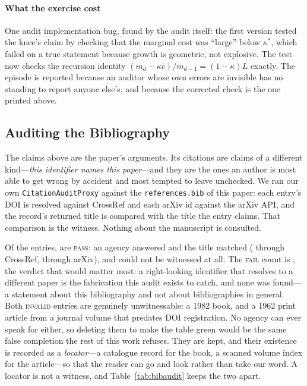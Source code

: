 \documentclass[conference]{IEEEtran}
\theoremstyle{definition}
\begin{document}
\paragraph{What the exercise cost} One audit implementation bug, found by the audit
itself: the first version tested the knee's claim by checking that the marginal
cost was ``large'' below $\kappa^{*}$, which failed on a true statement because
growth is geometric, not explosive. The test now checks the recursion identity
$({m_d-\kappa\bar c})/{m_{d-1}}=(1-\kappa)L$ exactly. The episode is reported
because an auditor whose own errors are invisible has no standing to report anyone
else's, and because the corrected check is the one printed above.

\subsection{Auditing the Bibliography}
\label{sec:bibaudit}

The claims above are the paper's arguments. Its citations are claims of a different
kind---\emph{this identifier names this paper}---and they are the ones an author is
most able to get wrong by accident and most tempted to leave unchecked. We ran our
own \texttt{CitationAuditProxy} against the \texttt{references.bib} of this paper:
each entry's DOI is resolved against CrossRef and each arXiv id against the arXiv
API, and the record's returned title is compared with the title the entry claims.
That comparison is the witness. Nothing about the manuscript is consulted.

Of the \caTotal{} entries, \caPass{} are \textsc{pass}: an agency answered and the
title matched (\caCrossrefCount{} through CrossRef, \caArxivCount{} through arXiv),
and \caInvalid{} could not be witnessed at all. The \textsc{fail} count is
\caFail{}, the verdict that would matter most: a right-looking identifier that
resolves to a different paper is the fabrication this audit exists to catch, and
none was found---a statement about this bibliography and not about bibliographies
in general. Both \textsc{invalid} entries are genuinely unwitnessable: a 1982 book,
and a 1962 print article from a journal volume that predates DOI registration. No
agency can ever speak for either, so deleting them to make the table green would be
the same false completion the rest of this work refuses. They are kept, and their
existence is recorded as a \emph{locator}---a catalogue record for the book, a
scanned volume index for the article---so that the reader can go and look rather
than take our word. A locator is not a witness, and Table~\ref{tab:bibaudit} keeps
the two apart.
\end{document}
